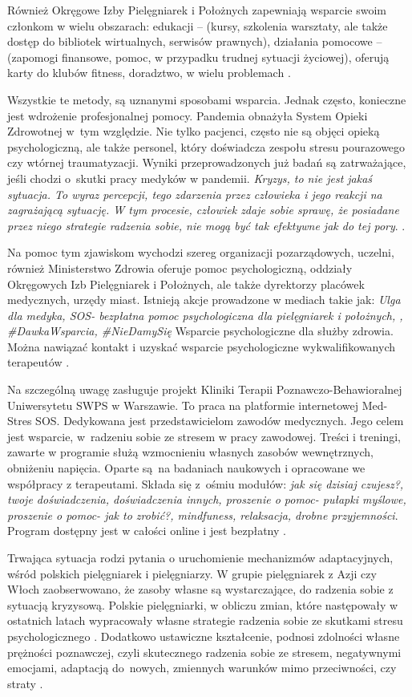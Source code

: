 \documentclass[a4paper,12pt,twoside,openright]{mwrep}
\begin{document}
Również Okręgowe Izby Pielęgniarek i Położnych zapewniają wsparcie swoim członkom w wielu obszarach: edukacji – (kursy, szkolenia warsztaty, ale także dostęp do bibliotek wirtualnych, serwisów prawnych), działania pomocowe – (zapomogi finansowe, pomoc, w przypadku trudnej sytuacji życiowej), oferują karty do klubów fitness, doradztwo, w wielu problemach \cite{izby}.

Wszystkie te metody, są uznanymi sposobami wsparcia. Jednak często, konieczne jest wdrożenie profesjonalnej pomocy. Pandemia obnażyła System Opieki Zdrowotnej w~tym względzie. Nie tylko pacjenci, często nie są objęci opieką psychologiczną, ale także personel, który doświadcza zespołu stresu pourazowego czy wtórnej traumatyzacji. Wyniki przeprowadzonych już badań są zatrważające, jeśli chodzi o~skutki pracy medyków w pandemii. \textit{Kryzys, to nie jest jakaś sytuacja. To wyraz percepcji, tego zdarzenia przez człowieka i jego reakcji na zagrażającą sytuację. W tym procesie, człowiek zdaje sobie sprawę, że posiadane przez niego strategie radzenia sobie, nie mogą być tak efektywne jak do tej pory}. \cite{covid}.

Na pomoc tym zjawiskom wychodzi szereg organizacji pozarządowych, uczelni, również Ministerstwo Zdrowia oferuje pomoc psychologiczną, oddziały Okręgowych Izb Pielęgniarek i Położnych, ale także dyrektorzy placówek medycznych, urzędy miast. Istnieją akcje prowadzone w mediach takie jak: \textit{Ulga dla medyka, SOS- bezpłatna pomoc psychologiczna dla pielęgniarek i położnych, , \#DawkaWsparcia, \#NieDamySię} Wsparcie psychologiczne dla służby zdrowia. Można nawiązać kontakt i uzyskać wsparcie psychologiczne wykwalifikowanych terapeutów \cite{jak}.

Na szczególną uwagę zasługuje projekt Kliniki Terapii Poznawczo-Behawioralnej Uniwersytetu SWPS w Warszawie. To praca na platformie internetowej Med-Stres SOS. Dedykowana jest przedstawicielom zawodów medycznych. Jego celem jest wsparcie, w~radzeniu sobie ze stresem w pracy zawodowej. Treści i treningi, zawarte w programie służą wzmocnieniu własnych zasobów wewnętrznych, obniżeniu napięcia. Oparte są~na badaniach naukowych i opracowane we współpracy z terapeutami. Składa się z~ośmiu modułów: \textit{jak się dzisiaj czujesz?, twoje doświadczenia, doświadczenia innych, proszenie o pomoc- pułapki myślowe, proszenie o pomoc- jak to zrobić?, mindfuness, relaksacja, drobne przyjemności}. Program dostępny jest w całości online i jest bezpłatny \cite{projekt}.

Trwająca sytuacja rodzi pytania o uruchomienie mechanizmów adaptacyjnych, wśród polskich pielęgniarek i pielęgniarzy. W grupie pielęgniarek z Azji czy Włoch zaobserwowano, że zasoby własne są wystarczające, do radzenia sobie z sytuacją kryzysową. Polskie pielęgniarki, w obliczu zmian, które następowały w ostatnich latach wypracowały własne strategie radzenia sobie ze skutkami stresu psychologicznego \cite{covid}. Dodatkowo ustawiczne kształcenie, podnosi zdolności własne prężności poznawczej, czyli skutecznego radzenia sobie ze stresem, negatywnymi emocjami, adaptacją do~nowych, zmiennych warunków mimo przeciwności, czy straty \cite{preznosc}. 
 
\end{document}
